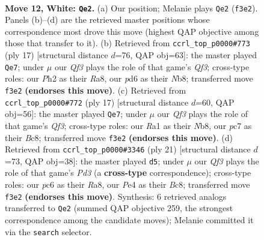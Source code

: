 \documentclass[11pt]{article}
\begin{document}
\clearpage

\begin{figure}[p]\centering
\begin{subfigure}{0.46\textwidth}\centering
\resizebox{\linewidth}{!}{%
\newchessgame
\chessboard[
  setfen={r1bq1rk1/2p2p2/2pp1np1/p3p1Np/4P3/2PP1QP1/P1P2P1P/R1B2RK1 w - - 0 12},
  showmover=false,
  pgfstyle=straightmove, color=movearrow, markmove={f3-e2}
]}
\caption{}
\end{subfigure}\hfill
\begin{subfigure}{0.46\textwidth}\centering
\resizebox{\linewidth}{!}{%
\newchessgame
\chessboard[
  setfen={rnb2rk1/ppp2pp1/4pq1p/3p4/2PP3P/2P1PN2/P4PP1/R2QKB1R b KQ - 0 9},
  showmover=false,
  pgfstyle=straightmove, color=movearrow, markmove={f6-e7}
]}
\caption{}
\end{subfigure}
\\[4pt]
\begin{subfigure}{0.46\textwidth}\centering
\resizebox{\linewidth}{!}{%
\newchessgame
\chessboard[
  setfen={rnb2rk1/ppp2pp1/4pq1p/3p4/2PP2P1/2P1PN2/P4P1P/R2QKB1R b KQ - 0 9},
  showmover=false,
  pgfstyle=straightmove, color=movearrow, markmove={f6-e7}
]}
\caption{}
\end{subfigure}\hfill
\begin{subfigure}{0.46\textwidth}\centering
\resizebox{\linewidth}{!}{%
\newchessgame
\chessboard[
  setfen={r1bq1rk1/1pp2ppp/p2p1n2/2P1p3/4P3/2PP1N1P/P2B1PP1/R2Q1RK1 b - - 0 11},
  showmover=false,
  pgfstyle=straightmove, color=movearrow, markmove={d6-d5}
]}
\caption{}
\end{subfigure}
\caption{\textbf{Move 12, White: \texttt{Qe2}.} (a) Our position; Melanie plays \texttt{Qe2} (\texttt{f3e2}). Panels (b)--(d) are the retrieved master positions whose correspondence most drove this move (highest QAP objective among those that transfer to it). (b) Retrieved from \texttt{ccrl\_top\_p0000\#773} (ply 17) [structural distance $d$=76, QAP obj=63]: the master played \texttt{Qe7}; under $\mu$ our \emph{Qf3} plays the role of that game's \emph{Qf3}; cross-type roles: our \emph{P}h2 as their \emph{R}a8, our \emph{p}d6 as their \emph{N}b8; transferred move \texttt{f3e2} \textbf{(endorses this move)}. (c) Retrieved from \texttt{ccrl\_top\_p0000\#772} (ply 17) [structural distance $d$=60, QAP obj=56]: the master played \texttt{Qe7}; under $\mu$ our \emph{Qf3} plays the role of that game's \emph{Qf3}; cross-type roles: our \emph{R}a1 as their \emph{N}b8, our \emph{p}c7 as their \emph{B}c8; transferred move \texttt{f3e2} \textbf{(endorses this move)}. (d) Retrieved from \texttt{ccrl\_top\_p0000\#3346} (ply 21) [structural distance $d$=73, QAP obj=38]: the master played \texttt{d5}; under $\mu$ our \emph{Qf3} plays the role of that game's \emph{Pd3} (a \textbf{cross-type} correspondence); cross-type roles: our \emph{p}c6 as their \emph{R}a8, our \emph{P}e4 as their \emph{B}c8; transferred move \texttt{f3e2} \textbf{(endorses this move)}. Synthesis: 6 retrieved analogs transferred to \texttt{Qe2} (summed QAP objective 259, the strongest correspondence among the candidate moves); Melanie committed it via the \texttt{search} selector.}
\label{fig:thought-m22}
\end{figure}
\end{document}
